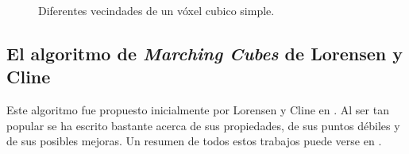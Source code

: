   \begin{figure}[htp]
  \begin{center}
  \end{center}
  \caption[Vecindades de un vóxel cúbico simple]{Diferentes vecindades de un vóxel cubico simple.}
  \label{fig:vecindades}
  \end{figure}


\subsection{El algoritmo de \textit{Marching Cubes} de Lorensen y Cline}
Este algoritmo fue propuesto inicialmente por Lorensen y Cline en \cite{MarchingCubes}. Al ser tan popular se ha escrito bastante acerca de sus propiedades, de sus puntos débiles y de sus posibles mejoras. Un resumen de todos estos trabajos puede verse en \cite{mcResumen}.

